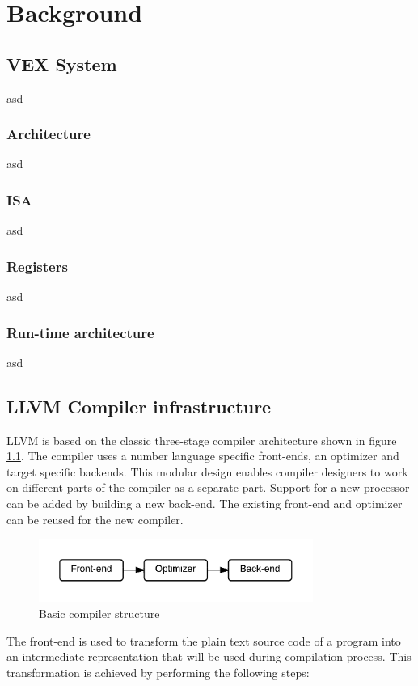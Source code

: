 \chapter{Background}
\label{chap:background}
\section{VEX System}
asd
\subsection{Architecture}
asd
\subsection{ISA}
asd
\subsection{Registers}
asd
\subsection{Run-time architecture}
asd

\section{LLVM Compiler infrastructure}
LLVM is based on the classic three-stage compiler architecture shown in figure \ref{fig:compiler_structure}. The compiler uses a number language specific front-ends, an optimizer and target specific backends. This modular design enables compiler designers to work on different parts of the compiler as a separate part. Support for a new processor can be added by building a new back-end. The existing front-end and optimizer can be reused for the new compiler.

\begin{figure}[ph!]
\centering
\includegraphics[width=0.8\textwidth]{2_background/img/Basic_compiler.png}
\caption{Basic compiler structure}
\label{fig:compiler_structure}
\end{figure}

The front-end is used to transform the plain text source code of a program into an intermediate representation that will be used during compilation process. This transformation is achieved by performing the following steps:

